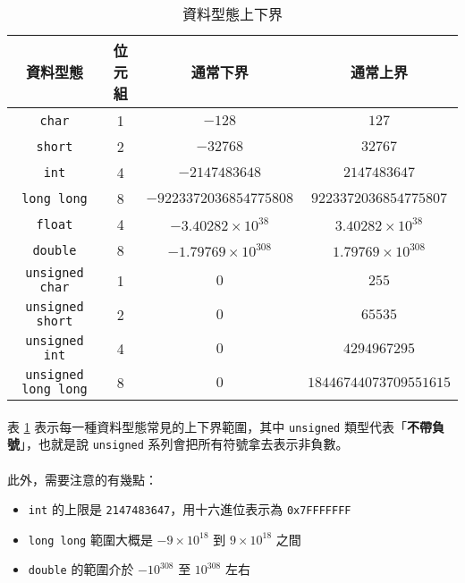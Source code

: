 \documentclass[12pt,a4paper,oneside]{article}
\begin{document}
\begin{CJK}{UTF8}{bkai}
\begin{table}[h!]
\centering
\begin{tabular}{|c|c|c|c|}
\hline
\textbf{資料型態} & \textbf{位元組} & \textbf{通常下界} & \textbf{通常上界}\\
\hline\hline
\lstinline!char!      & 1 & $-128$        & $127$       \\
\hline
\lstinline!short!     & 2 & $-32768$      & $32767$     \\
\hline
\lstinline!int!       & 4 & $-2147483648$ & $2147483647$\\
\hline
\lstinline!long long! & 8 & $-9223372036854775808$ & $9223372036854775807$\\
\hline
\lstinline!float!     & 4 & $-3.40282\times{10^{38}}$ & $3.40282\times{10^{38}}$\\
\hline
\lstinline!double!    & 8 & $-1.79769\times{10^{308}}$ & $1.79769\times{10^{308}}$\\
\hline
\lstinline!unsigned char!      & 1 & $0$ & $255$\\
\hline
\lstinline!unsigned short!     & 2 & $0$ & $65535$\\
\hline
\lstinline!unsigned int!       & 4 & $0$ & $4294967295$\\
\hline
\lstinline!unsigned long long! & 8 & $0$ & $18446744073709551615$\\
\hline
\end{tabular}
\caption{資料型態上下界}
\label{program:struct:table:datatype:limit}
\end{table}

\paragraph{}表 \ref{program:struct:table:datatype:limit} 表示每一種資料型態常見的上下界範圍，其中 \lstinline!unsigned! 類型代表「\textbf{不帶負號}」，也就是說 \lstinline!unsigned! 系列會把所有符號拿去表示非負數。
\paragraph{}此外，需要注意的有幾點：
\begin{itemize}
\item \lstinline!int! 的上限是 \lstinline!2147483647!，用十六進位表示為 \lstinline!0x7FFFFFFF!
\item \lstinline!long long! 範圍大概是 $-9\times{10^{18}}$ 到 $9\times{10^{18}}$ 之間
\item \lstinline!double! 的範圍介於 $-{10}^{308}$ 至 ${10}^{308}$ 左右
\end{itemize}

\end{CJK}
\end{document}
